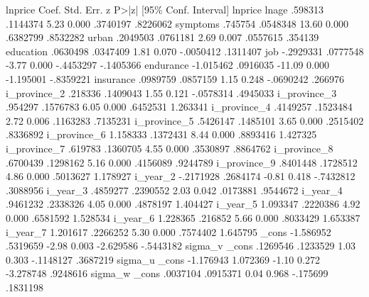      lnprice {\VBAR}      Coef.   Std. Err.      z    P>|z|     [95\% Conf. Interval]
lnprice      {\VBAR}
       lnage {\VBAR}    .598313   .1144374     5.23   0.000     .3740197    .8226062
    symptoms {\VBAR}    .745754   .0548348    13.60   0.000     .6382799    .8532282
       urban {\VBAR}   .2049503   .0761181     2.69   0.007     .0557615     .354139
   education {\VBAR}   .0630498   .0347409     1.81   0.070    -.0050412    .1311407
         job {\VBAR}  -.2929331   .0777548    -3.77   0.000    -.4453297   -.1405366
   endurance {\VBAR}  -1.015462   .0916035   -11.09   0.000    -1.195001   -.8359221
   insurance {\VBAR}   .0989759   .0857159     1.15   0.248    -.0690242     .266976
i_province_2 {\VBAR}    .218336   .1409043     1.55   0.121    -.0578314    .4945033
i_province_3 {\VBAR}    .954297   .1576783     6.05   0.000     .6452531    1.263341
i_province_4 {\VBAR}   .4149257   .1523484     2.72   0.006     .1163283    .7135231
i_province_5 {\VBAR}   .5426147   .1485101     3.65   0.000     .2515402    .8336892
i_province_6 {\VBAR}   1.158333   .1372431     8.44   0.000     .8893416    1.427325
i_province_7 {\VBAR}    .619783   .1360705     4.55   0.000     .3530897    .8864762
i_province_8 {\VBAR}   .6700439   .1298162     5.16   0.000     .4156089    .9244789
i_province_9 {\VBAR}   .8401448   .1728512     4.86   0.000     .5013627    1.178927
    i_year_2 {\VBAR}  -.2171928   .2684174    -0.81   0.418    -.7432812    .3088956
    i_year_3 {\VBAR}   .4859277   .2390552     2.03   0.042     .0173881    .9544672
    i_year_4 {\VBAR}   .9461232   .2338326     4.05   0.000     .4878197    1.404427
    i_year_5 {\VBAR}   1.093347   .2220386     4.92   0.000     .6581592    1.528534
    i_year_6 {\VBAR}   1.228365    .216852     5.66   0.000     .8033429    1.653387
    i_year_7 {\VBAR}   1.201617   .2266252     5.30   0.000     .7574402    1.645795
       _cons {\VBAR}  -1.586952   .5319659    -2.98   0.003    -2.629586   -.5443182
sigma_v      {\VBAR}
       _cons {\VBAR}   .1269546   .1233529     1.03   0.303    -.1148127    .3687219
sigma_u      {\VBAR}
       _cons {\VBAR}  -1.176943   1.072369    -1.10   0.272    -3.278748    .9248616
sigma_w      {\VBAR}
       _cons {\VBAR}   .0037104   .0915371     0.04   0.968     -.175699    .1831198
